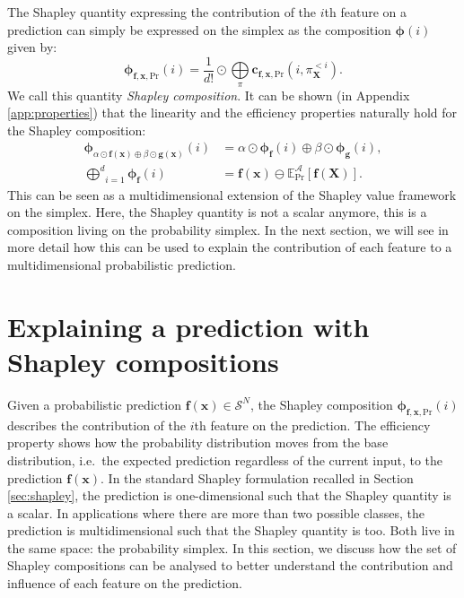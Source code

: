 \documentclass{article}
\theoremstyle{plain}
\theoremstyle{definition}
\theoremstyle{remark}
\begin{document}
The Shapley quantity expressing the contribution of the $i$th feature on a prediction can simply be expressed on the simplex as the composition $\bm{\phi}(i)$ given by:
\begin{equation}
  \bm{\phi}_{\bm{f},\bm{x},\text{Pr}}(i) = \frac{1}{d!} \odot \underset{\pi}{\bigoplus}\bm{c}_{\bm{f},\bm{x},\text{Pr}}(i,\pi^{<i}_{\bm{X}}).
\end{equation}
We call this quantity \emph{Shapley composition}. It can be shown (in Appendix \ref{app:properties}) that the linearity and the efficiency properties naturally hold for the Shapley composition:
\begin{equation}
  \begin{aligned}
    \bm{\phi}_{\alpha \odot \bm{f}(\bm{x}) \oplus \beta \odot \bm{g}(\bm{x})}(i) &= \alpha \odot \bm{\phi}_{\bm{f}}(i) \oplus \beta\odot \bm{\phi}_{\bm{g}}(i),\\
    \underset{i=1}{\overset{d}\bigoplus} \bm{\phi}_{\bm{f}}(i) &= \bm{f}(\bm{x}) \ominus \mathbb{E}^{\mathcal{A}}_{\text{Pr}}[\bm{f}(\bm{X})].
  \end{aligned}
\end{equation}
This can be seen as a multidimensional extension of the Shapley value framework on the simplex. Here, the Shapley quantity is not a scalar anymore, this is a composition living on the probability simplex. In the next section, we will see in more detail how this can be used to explain the contribution of each feature to a multidimensional probabilistic prediction.

\section{Explaining a prediction with Shapley compositions}
\label{sec:explain}

Given a probabilistic prediction $\bm{f}(\bm{x}) \in \mathcal{S}^N$, the Shapley composition $\bm{\phi}_{\bm{f},\bm{x},\text{Pr}}(i)$ describes the contribution of the $i$th feature on the prediction. The efficiency property shows how the probability distribution moves from the base distribution, i.e.~the expected prediction regardless of the current input, to the prediction $\bm{f}(\bm{x})$. In the standard Shapley formulation recalled in Section \ref{sec:shapley}, the prediction is one-dimensional such that the Shapley quantity is a scalar. In applications where there are more than two possible classes, the prediction is multidimensional such that the Shapley quantity is too. Both live in the same space: the probability simplex. In this section, we discuss how the set of Shapley compositions can be analysed to better understand the contribution and influence of each feature on the prediction.
\end{document}
